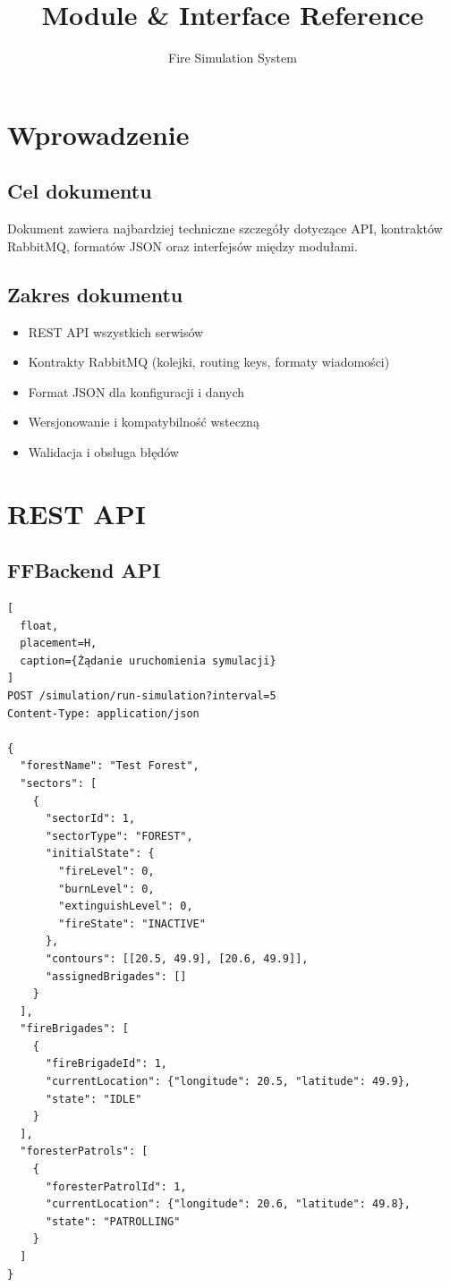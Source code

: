\documentclass[11pt,a4paper] {article}
\title{Module \& Interface Reference}
\author{Fire Simulation System}
\begin{document}
\maketitle
\newpage

\section{Wprowadzenie}

\subsection{Cel dokumentu}

Dokument zawiera najbardziej techniczne szczegóły dotyczące API, kontraktów RabbitMQ, formatów JSON oraz interfejsów między modułami. 

\subsection{Zakres dokumentu}

\begin{itemize}
    \item REST API wszystkich serwisów
    \item Kontrakty RabbitMQ (kolejki, routing keys, formaty wiadomości)
    \item Format JSON dla konfiguracji i danych
    \item Wersjonowanie i kompatybilność wsteczną
    \item Walidacja i obsługa błędów
\end{itemize}

\section{REST API}

\subsection{FFBackend API}

\begin{lstlisting}[
  float,
  placement=H,
  caption={Żądanie uruchomienia symulacji}
]
POST /simulation/run-simulation?interval=5
Content-Type: application/json

{
  "forestName": "Test Forest",
  "sectors": [
    {
      "sectorId": 1,
      "sectorType": "FOREST",
      "initialState": {
        "fireLevel": 0,
        "burnLevel": 0,
        "extinguishLevel": 0,
        "fireState": "INACTIVE"
      },
      "contours": [[20.5, 49.9], [20.6, 49.9]],
      "assignedBrigades": []
    }
  ],
  "fireBrigades": [
    {
      "fireBrigadeId": 1,
      "currentLocation": {"longitude": 20.5, "latitude": 49.9},
      "state": "IDLE"
    }
  ],
  "foresterPatrols": [
    {
      "foresterPatrolId": 1,
      "currentLocation": {"longitude": 20.6, "latitude": 49.8},
      "state": "PATROLLING"
    }
  ]
}
\end{lstlisting}
\end{document}
